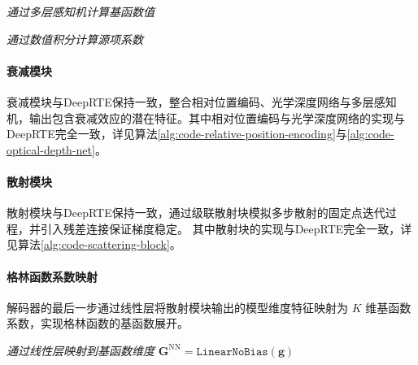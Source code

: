 \begin{algorithm}[htp!]
    \caption{编码器（Encoder）}\label{alg:encoder}
    \SetAlgoLined

    \emph{通过多层感知机计算基函数值}\;

    \emph{通过数值积分计算源项系数}\;

    \;
\end{algorithm}

\paragraph{衰减模块} 衰减模块与DeepRTE保持一致，整合相对位置编码、光学深度网络与多层感知机，输出包含衰减效应的潜在特征。其中相对位置编码与光学深度网络的实现与DeepRTE完全一致，详见算法\ref{alg:code-relative-position-encoding}与\ref{alg:code-optical-depth-net}。

\paragraph{散射模块} 散射模块与DeepRTE保持一致，通过级联散射块模拟多步散射的固定点迭代过程，并引入残差连接保证梯度稳定。
其中散射块的实现与DeepRTE完全一致，详见算法\ref{alg:code-scattering-block}。

\paragraph{格林函数系数映射} 解码器的最后一步通过线性层将散射模块输出的模型维度特征映射为 $K$ 维基函数系数，实现格林函数的基函数展开。

\begin{algorithm}[htp!]
    \caption{格林函数系数映射（Green Function Coefficient Projection）}\label{alg:green_projection}
    \SetAlgoLined

    \emph{通过线性层映射到基函数维度}\;
    $\boldsymbol{G}^{\text{NN}} = \texttt{LinearNoBias}(\bm{g})$\;

    \;
\end{algorithm}

